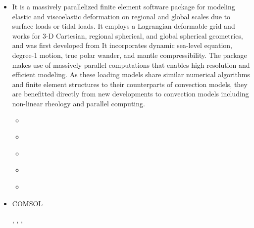 \begin{itemize}
\item \citcomsve {}

It is a massively parallelized finite element software package for modeling elastic 
and viscoelastic deformation on regional and global scales due to 
surface loads or tidal loads. 
It employs a Lagrangian deformable grid and works for 3-D Cartesian, 
regional spherical, and global spherical geometries, and was first developed from \citcoms
It incorporates dynamic sea-level equation, degree-1 motion, true polar wander, 
and mantle compressibility. The package makes use of massively parallel computations 
that enables high resolution and efficient modeling. 
As these loading models share similar numerical algorithms and finite element 
structures to their counterparts of convection models, they are benefitted directly 
from new developments to convection models including non-linear rheology and parallel computing. 

\begin{scriptsize}
\begin{itemize}
\item[\twothousandthree]     \textcite{zhpw03}
\item[\twothousandfive]      \textcite{pazw05}
\item[\twothousandtwelve]    \textcite{zhqa12}
\item[\twothousandthirteen]  \textcite{awzh13}
\item[\twothousandtwentytwo] \textcite{kaza22}
\end{itemize}
\end{scriptsize}



\item {\codefont COMSOL} 

\begin{scriptsize}
\twothousandeight
\textcite{vack08}
\twothousandtwelve
\textcite{ronb12}
\twothousandfourteen
\textcite{cuwi14}
\textcite{paml14b}
\twothousandfifteen
\textcite{rasg15},
\textcite{khfh15}
\twothousandtwentyone
\textcite{chap21},
\textcite{trbs21},
\textcite{khmo21}
\textcite{lesc21}
\textcite{dasm21}
\end{scriptsize}


\end{itemize}
